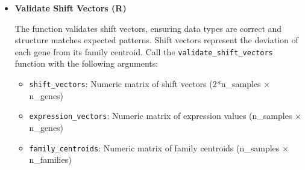 \documentclass[11pt]{article}
\begin{document}
\begin{enumerate}
\begin{itemize}
	      	      The function validates family centroids data, checking for NaN/Inf values
	      	      and proper data structure. Centroids represent the central tendency of each
	      	      gene family's expression profile. Call the \texttt{validate\_family\_centroids}
	      	      function with the following arguments:
	      	      
	      	      \begin{itemize}
	      	      	\item \texttt{family\_centroids}: Numeric matrix of family centroids (n\_samples
	      	      	      × n\_families)
	      	      	      
	      	      	\item \texttt{n\_families}: Number of gene families
	      	      	      
	      	      	\item \texttt{n\_samples}: Number of samples
	      	      \end{itemize}
	      	      
	      	      \begin{lstlisting}[language=R, caption={R Validate Family Centroids}]
validate_family_centroids(family_centroids, n_families, n_samples)
	      	      \end{lstlisting}
	      	      
	      	\item \textbf{Validate Shift Vectors (R)}
	      	      
	      	      The function validates shift vectors, ensuring data types are correct and
	      	      structure matches expected patterns. Shift vectors represent the deviation
	      	      of each gene from its family centroid. Call the \texttt{validate\_shift\_vectors}
	      	      function with the following arguments:
	      	      
	      	      \begin{itemize}
	      	      	\item \texttt{shift\_vectors}: Numeric matrix of shift vectors (2*n\_samples
	      	      	      × n\_genes)
	      	      	      
	      	      	\item \texttt{expression\_vectors}: Numeric matrix of expression values (n\_samples
	      	      	      × n\_genes)
	      	      	      
	      	      	\item \texttt{family\_centroids}: Numeric matrix of family centroids (n\_samples
	      	      	      × n\_families)
	      	      	      

\end{itemize}
\end{itemize}
\end{enumerate}
\end{document}
